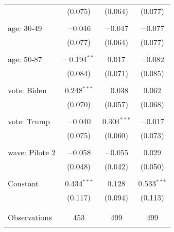 \begin{tabular}{@{\extracolsep{5pt}}lccc}
  & (0.075) & (0.064) & (0.077) \\ 
  & & & \\ 
 age: 30-49 & $-$0.046 & $-$0.047 & $-$0.077 \\ 
  & (0.077) & (0.064) & (0.077) \\ 
  & & & \\ 
 age: 50-87 & $-$0.194$^{**}$ & 0.017 & $-$0.082 \\ 
  & (0.084) & (0.071) & (0.085) \\ 
  & & & \\ 
 vote: Biden & 0.248$^{***}$ & $-$0.038 & 0.062 \\ 
  & (0.070) & (0.057) & (0.068) \\ 
  & & & \\ 
 vote: Trump & $-$0.040 & 0.304$^{***}$ & $-$0.017 \\ 
  & (0.075) & (0.060) & (0.073) \\ 
  & & & \\ 
 wave: Pilote 2 & $-$0.058 & $-$0.055 & 0.029 \\ 
  & (0.048) & (0.042) & (0.050) \\ 
  & & & \\ 
 Constant & 0.434$^{***}$ & 0.128 & 0.533$^{***}$ \\ 
  & (0.117) & (0.094) & (0.113) \\ 
  & & & \\ 
\hline \\[-1.8ex] 

Observations & 453 & 499 & 499 \\ 
\hline 
\hline \\[-1.8ex] 
\end{tabular} 